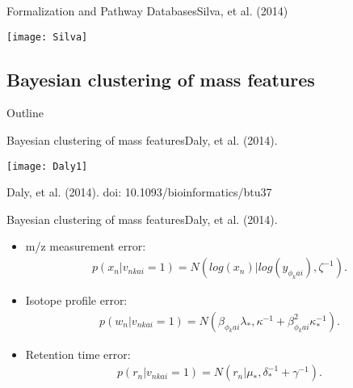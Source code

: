 \documentclass[xcolor=dvipsnames]{beamer}
\begin{document}
\begin{frame}{Formalization and Pathway Databases}{Silva, et al. (2014)}
	\vspace{-12pt}
	\begin{center}
		\texttt{[image: Silva]}
	\end{center}
\end{frame}

\subsection{Bayesian clustering of mass features}
\begin{frame}{Outline}
	\vspace{-10.5pt}
	\tableofcontents[currentsection,subsectionstyle=show/shaded/hide]
\end{frame}

\begin{frame}{Bayesian clustering of mass features}{Daly, et al. (2014).}
	\vspace{-12pt}
	\begin{center}
		\texttt{[image: Daly1]}
		
		Daly, et al. (2014). doi: 10.1093/bioinformatics/btu37
	\end{center}
\end{frame}

\begin{frame}{Bayesian clustering of mass features}{Daly, et al. (2014).}
	\vspace{-12pt}
	\begin{itemize}
		\item m/z measurement error:
			\begin{align*}
			p(x_n|v_{nkai}=1) = N(log(x_n)|log(y_{\phi_k ai}),\zeta^{-1}). 
			\end{align*} \pause
		\item Isotope profile error:
			\begin{align*}
			p(w_n|v_{nkai}=1)=N(\beta_{\phi_k ai} \lambda_{*},\kappa^{-1}+\beta^2_{\phi_k ai}\kappa^{-1}_{*}).
			\end{align*} \pause
		\item Retention time error:
			\begin{align*}
			p(r_n|v_{nkai}=1)=N(r_n|\mu_*,\delta_*^{-1}+\gamma^{-1}).
			\end{align*}
	\end{itemize}
\end{frame}
\end{document}
